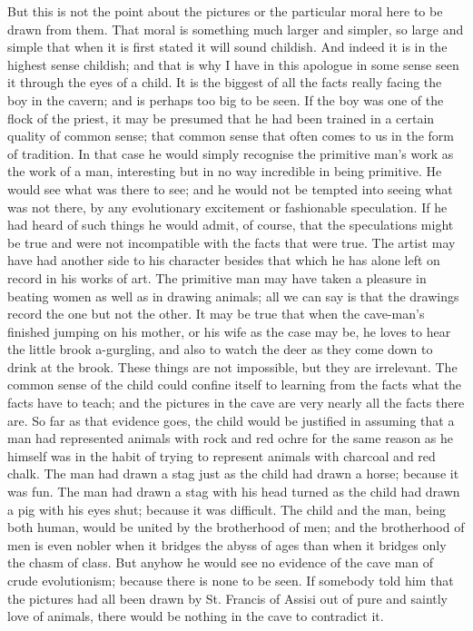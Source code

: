 But this is not the point about the pictures or the particular moral here to be drawn from them. That moral is something much larger and simpler, so large and simple that when it is first stated it will sound childish. And indeed it is in the highest sense childish; and that is why I have in this apologue in some sense seen it through the eyes of a child. It is the biggest of all the facts really facing the boy in the cavern; and is perhaps too big to be seen. If the boy was one of the flock of the priest, it may be presumed that he had been trained in a certain quality of common sense; that common sense that often comes to us in the form of tradition. In that case he would simply recognise the primitive man's work as the work of a man, interesting but in no way incredible in being primitive. He would see what was there to see; and he would not be tempted into seeing what was not there, by any evolutionary excitement or fashionable speculation. If he had heard of such things he would admit, of course, that the speculations might be true and were not incompatible with the facts that were true. The artist may have had another side to his character besides that which he has alone left on record in his works of art. The primitive man may have taken a pleasure in beating women as well as in drawing animals; all we can say is that the drawings record the one but not the other. It may be true that when the cave-man's finished jumping on his mother, or his wife as the case may be, he loves to hear the little brook a-gurgling, and also to watch the deer as they come down to drink at the brook. These things are not impossible, but they are irrelevant. The common sense of the child could confine itself to learning from the facts what the facts have to teach; and the pictures in the cave are very nearly all the facts there are. So far as that evidence goes, the child would be justified in assuming that a man had represented animals with rock and red ochre for the same reason as he himself was in the habit of trying to represent animals with charcoal and red chalk. The man had drawn a stag just as the child had drawn a horse; because it was fun. The man had drawn a stag with his head turned as the child had drawn a pig with his eyes shut; because it was difficult. The child and the man, being both human, would be united by the brotherhood of men; and the brotherhood of men is even nobler when it bridges the abyss of ages than when it bridges only the chasm of class. But anyhow he would see no evidence of the cave man of crude evolutionism; because there is none to be seen. If somebody told him that the pictures had all been drawn by St. Francis of Assisi out of pure and saintly love of animals, there would be nothing in the cave to contradict it.


